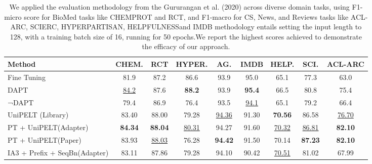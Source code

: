 \documentclass[10pt,twocolumn,letterpaper]{article}
\begin{document}
\begin{table*}[!htbp]
\small %
  \centering
  \label{tab:domain-results}
\begin{tabular}{lcccccccc}
\hline
\textbf{Method} & \textbf{CHEM.} & \textbf{RCT} & \textbf{HYPER.} & \textbf{AG.} & \textbf{IMDB} & \textbf{HELP.} & \textbf{SCI.} & \textbf{ACL-ARC} \\
\hline
Fine Tuning & 81.9 & 87.2 & 86.6 & 93.9 & 95.0 & 65.1 & 77.3 & 63.0 \\
DAPT & \underline{84.2} & 87.6 & \textbf{88.2} & 93.9 & \textbf{95.4} & 66.5 & 80.8 & 75.4 \\
¬DAPT & 79.4 & 86.9 & 76.4 & 93.5 & \underline{94.1} & 65.1 & 79.2 & 66.4 \\
UniPELT (Library) &  83.40 & 88.00  & 79.28 & \underline{94.36} & 91.30 & \textbf{70.56} & 86.58  & \underline{76.70} \\
PT + UniPELT(Adapter) & \textbf{84.34} & \textbf{88.04} & \underline{80.31} & 94.27 & 91.60 & \underline{70.32} & \underline{86.81} & \textbf{82.10} \\
PT + UniPELT(Paper) & 83.93 & \underline{88.03} & 76.28 & \textbf{94.42} & 91.50 & 70.14 & \textbf{87.23} & \textbf{82.10} \\
IA3 + Prefix + SeqBn(Adapter) & 83.11 & 87.86 & 79.28 & 94.10 & 90.42 & \underline{70.51} & 81.02 & 67.99 \\


\hline
\end{tabular}
\caption{We applied the evaluation methodology from the Gururangan et al. (2020) across diverse domain tasks, using F1-micro score for BioMed tasks like CHEMPROT\cite{Kringelum2016} and RCT\cite{dernoncourt-lee-2017-pubmed}, and F1-macro for CS, News, and Reviews tasks like ACL-ARC\cite{jurgens-etal-2018-measuring}, SCIERC\cite{luan-etal-2018-multi}, HYPERPARTISAN\cite{kiesel-etal-2019-semeval}, HELPFULNESS\cite{McAuley2015}and IMDB\cite{maas-etal-2011-learning} methodology entails setting the input length to 128, with a training batch size of 16, running for 50 epochs.We report the highest scores achieved to demonstrate the efficacy of our approach.}
  \label{tab:table4}
\end{table*}
\end{document}
